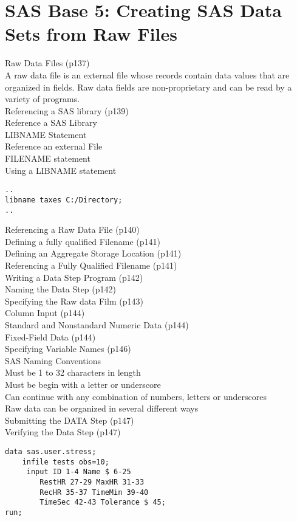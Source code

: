\section{SAS Base 5: Creating SAS Data Sets from Raw Files}

Raw Data Files (p137)\\
A raw data file is an external file whose records contain data values that are organized in fields. Raw data fields are non-proprietary and can be read by a variety of programs.\\
Referencing a SAS library (p139)\\
Reference a SAS Library\\
LIBNAME Statement\\
Reference an external File\\
FILENAME statement\\
Using a LIBNAME statement
\begin{framed}
\begin{verbatim}
..
libname taxes C:/Directory;
..
\end{verbatim}
\end{framed}

Referencing a Raw Data File (p140)\\
Defining a fully qualified Filename (p141)\\
Defining an Aggregate Storage Location (p141)\\
Referencing a Fully Qualified Filename (p141)\\
Writing a Data Step Program (p142)\\
Naming the Data Step (p142)\\
Specifying the Raw data Film (p143)\\
Column Input (p144)\\
Standard and Nonstandard Numeric Data (p144)\\
Fixed-Field Data (p144)\\
Specifying Variable Names (p146)\\
SAS Naming Conventions\\
Must be 1 to 32 characters in length\\
Must be begin with a letter or underscore\\
Can continue with any combination of numbers, letters or underscores\\
Raw data can be organized in several different ways\\
Submitting the DATA Step (p147)\\
Verifying the Data Step (p147)\\
\begin{framed}
\begin{verbatim}
data sas.user.stress;
 	infile tests obs=10;
     input ID 1-4 Name $ 6-25
       	RestHR 27-29 MaxHR 31-33
       	RecHR 35-37 TimeMin 39-40
       	TimeSec 42-43 Tolerance $ 45;
run;
\end{verbatim}
\end{framed}

